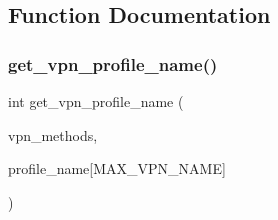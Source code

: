 \subsection{Function Documentation}
\mbox{\label{app-profile_8h_a568d74dfa94c9cd629fa492a431fcbf5}} 
\subsubsection{\texorpdfstring{get\+\_\+vpn\+\_\+profile\+\_\+name()}{get\_vpn\_profile\_name()}}
{\footnotesize\ttfamily int get\+\_\+vpn\+\_\+profile\+\_\+name (\begin{DoxyParamCaption}\item[{enum \hyperlink{route-tree_8h_a5b876670828c4e38106ba1c6d91024b7}{V\+P\+N\+\_\+\+M\+E\+T\+H\+O\+DS}}]{vpn\+\_\+methods,  }\item[{char}]{profile\+\_\+name\mbox{[}\+M\+A\+X\+\_\+\+V\+P\+N\+\_\+\+N\+A\+M\+E\mbox{]} }\end{DoxyParamCaption})}

